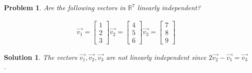 \documentclass{article}
\newtheorem{problem}{Problem}
\newtheorem*{solution}{Solution}
\begin{document}
\begin{problem}
Are the following vectors in $\mathbb{R}^7$ linearly independent?

\begin{align*}
\vec{v_{1}} = \begin{bmatrix} 1 \\ 2 \\ 3 \end{bmatrix}
\vec{v_{2}} = \begin{bmatrix} 4 \\ 5 \\ 6 \end{bmatrix}
\vec{v_{3}} = \begin{bmatrix} 7 \\ 8 \\ 9 \end{bmatrix}
\end{align*}
\end{problem}

\begin{solution}
The vectors $\vec{v_{1}}, \vec{v_{2}}, \vec{v_{3}}$ are not linearly independent since $2\vec{v_{2}} - \vec{v_{1}} = \vec{v_{3}}$.
\end{solution}
\end{document}
